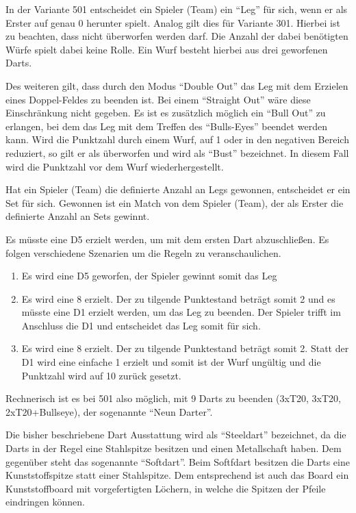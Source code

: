 In der Variante 501 entscheidet ein Spieler (Team) ein "`Leg"' für sich, wenn er als Erster auf genau 0 herunter spielt. Analog gilt dies für Variante 301.
Hierbei ist zu beachten, dass nicht überworfen werden darf.
Die Anzahl der dabei benötigten Würfe spielt dabei keine Rolle. Ein Wurf besteht hierbei aus drei geworfenen Darts.
 
Des weiteren gilt, dass durch den Modus "`Double Out"' das Leg mit dem Erzielen eines Doppel-Feldes zu beenden ist. Bei einem "`Straight Out"' wäre diese Einschränkung nicht gegeben.
Es ist es zusätzlich möglich ein "`Bull Out"' zu erlangen, bei dem das Leg mit dem Treffen des "`Bulls-Eyes"' beendet werden kann. 
Wird die Punktzahl durch einem Wurf, auf 1 oder in den negativen Bereich reduziert, so gilt er als überworfen und wird als "`Bust"' bezeichnet. In diesem Fall wird die Punktzahl vor dem Wurf wiederhergestellt. \autocite[5]{DartsRegel2016} 

Hat ein Spieler (Team) die definierte Anzahl an Legs gewonnen, entscheidet er ein Set für sich. Gewonnen ist ein Match von dem Spieler (Team), der als Erster die definierte Anzahl an Sets gewinnt.

\begin{example*} 

Es müsste eine D5 erzielt werden, um mit dem ersten Dart abzuschließen. Es folgen verschiedene Szenarien um die Regeln zu veranschaulichen.
\begin{enumerate}
	\item Es wird eine D5 geworfen, der Spieler gewinnt somit das Leg
	\item Es wird eine 8 erzielt. Der zu tilgende Punktestand beträgt somit 2 und es müsste eine D1 erzielt werden, um das Leg zu beenden. Der Spieler trifft im Anschluss die D1 und entscheidet das Leg somit für sich. 
	\item Es wird eine 8 erzielt. Der zu tilgende Punktestand beträgt somit 2. Statt der D1 wird eine einfache 1 erzielt und somit ist der Wurf ungültig und die Punktzahl wird auf 10 zurück gesetzt.
\end{enumerate}
\end{example*}

Rechnerisch ist es bei 501 also möglich, mit 9 Darts zu beenden (3xT20, 3xT20, 2xT20+Bullseye), der sogenannte "`Neun Darter"'.

Die bisher beschriebene Dart Ausstattung wird als "`Steeldart"' bezeichnet, da die Darts in der Regel eine Stahlspitze besitzen und einen Metallschaft haben. Dem gegenüber steht das sogenannte "`Softdart"'. Beim Softfdart besitzen die Darts eine Kunststoffspitze statt einer Stahlspitze. Dem entsprechend ist auch das Board ein Kunststoffboard mit vorgefertigten Löchern, in welche die Spitzen der Pfeile eindringen können. 

